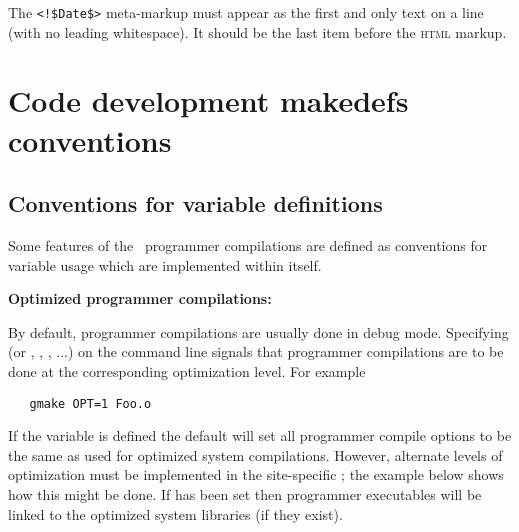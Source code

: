 \noindent
The \verb+<!$+\verb+Date$>+ meta-markup must appear as the first and only text
on a line (with no leading whitespace).  It should be the last item before the
 \textsc{html} markup.
 
 
\newpage
\section{Code development makedefs conventions}
\label{Code development makedefs conventions}

\subsection*{Conventions for  variable definitions}
 
Some features of the \aipspp\ programmer compilations are defined as
conventions for variable usage which are implemented within 
itself.
 
\textbf{Optimized programmer compilations:}
 
By default, programmer compilations are usually done in debug mode.
Specifying  (or , , , ...) on the
 command line signals that programmer compilations are to be
done at the corresponding optimization level.  For example
 
\begin{verbatim}
   gmake OPT=1 Foo.o
\end{verbatim}
 
\noindent
If the  variable is defined the default  will set
all programmer compile options to be the same as used for optimized system
compilations.  However, alternate levels of optimization must be implemented
in the site-specific ; the example below shows how this might
be done.  If  has been set then programmer executables will be
linked to the optimized system libraries (if they exist).
 

